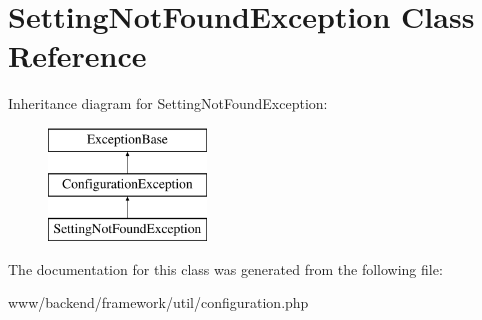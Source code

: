 \hypertarget{classSettingNotFoundException}{
\section{SettingNotFoundException Class Reference}
\label{classSettingNotFoundException}
}
Inheritance diagram for SettingNotFoundException:\begin{figure}[H]
\begin{center}
\leavevmode
\includegraphics[height=3.000000cm]{classSettingNotFoundException}
\end{center}
\end{figure}


The documentation for this class was generated from the following file:\begin{DoxyCompactItemize}
\item 
www/backend/framework/util/configuration.php\end{DoxyCompactItemize}

